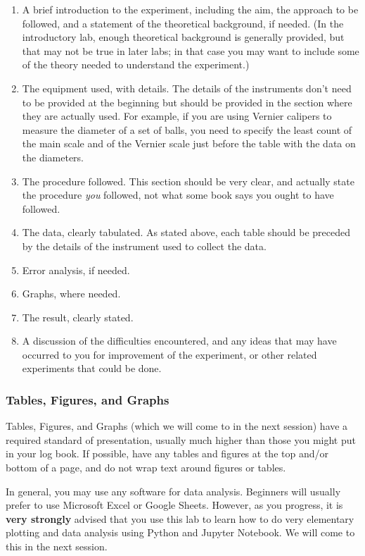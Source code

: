 \begin{enumerate}
    \item A brief introduction to the experiment, including the aim, the approach to be followed, and a statement of the theoretical background, if needed. (In the introductory lab, enough theoretical background is generally provided, but that may not be true in later labs; in that case you may want to include some of the theory needed to understand the experiment.)
    \item The equipment used, with details. The details of the instruments don't need to be provided at the beginning but should be provided in the section where they are actually used. For example, if you are using Vernier calipers to measure the diameter of a set of balls, you need to specify the least count of the main scale and of the Vernier scale just before the table with the data on the diameters. 
    \item The procedure followed. This section should be very clear, and actually state the procedure \textit{you} followed, not what some book says you ought to have followed. 
    \item The data, clearly tabulated. As stated above, each table should be preceded by the details of the instrument used to collect the data.
    \item Error analysis, if needed.  
    \item Graphs, where needed.
    \item The result, clearly stated. 
    \item A discussion of the difficulties encountered, and any ideas that may have occurred to you for improvement of the experiment, or other related experiments that could be done.
    
\end{enumerate}

\subsubsection{Tables, Figures, and Graphs}

Tables, Figures, and Graphs (which we will come to in the next session) have a required standard of presentation, usually much higher than those you might put in your log book. If possible, have any tables and figures at the top and/or bottom of a page, and do not wrap text around figures or tables.

\begin{imp}
In general, you may use any software for data analysis. Beginners will usually prefer to use Microsoft Excel or Google Sheets. However, as you progress, it is \textbf{very strongly} advised that you use this lab to learn how to do very elementary plotting and data analysis using Python and Jupyter Notebook. We will come to this in the next session.
\end{imp}


